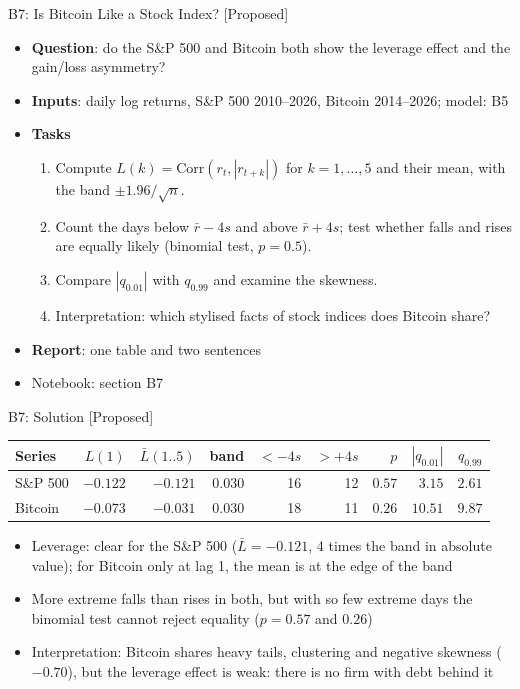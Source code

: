 \begin{frame}{B7: Is Bitcoin Like a Stock Index? [Proposed]}
\itemsize{\footnotesize}
\begin{itemize}
\item \textbf{Question}: do the S\&P 500 and Bitcoin both show the leverage effect and the gain/loss asymmetry?
\item \textbf{Inputs}: daily log returns, S\&P 500 2010--2026, Bitcoin 2014--2026; model: B5
\item \textbf{Tasks}
\begin{enumerate}
    \item Compute $L(k) = \text{Corr}(r_t, |r_{t+k}|)$ for $k = 1, \dots, 5$ and their mean, with the band $\pm 1.96/\sqrt n$.
    \item Count the days below $\bar r - 4s$ and above $\bar r + 4s$; test whether falls and rises are equally likely (binomial test, $p = 0.5$).
    \item Compare $|q_{0.01}|$ with $q_{0.99}$ and examine the skewness.
    \item Interpretation: which stylised facts of stock indices does Bitcoin share?
\end{enumerate}
\item \textbf{Report}: one table and two sentences
\item Notebook: section B7
\end{itemize}
\end{frame}

\ifsolutions
\begin{frame}{B7: Solution [Proposed]}
\itemsize{\footnotesize}
\begin{center}
\footnotesize
\begin{tabular}{lrrrrrrrr}
\toprule
Series & $L(1)$ & $\bar L(1..5)$ & band & $< -4s$ & $> +4s$ & $p$ & $|q_{0.01}|$ & $q_{0.99}$ \\
\midrule
S\&P 500 & $-0.122$ & $-0.121$ & $0.030$ & 16 & 12 & $0.57$ & $3.15$ & $2.61$ \\
Bitcoin & $-0.073$ & $-0.031$ & $0.030$ & 18 & 11 & $0.26$ & $10.51$ & $9.87$ \\
\bottomrule
\end{tabular}
\end{center}
\begin{itemize}
    \item Leverage: clear for the S\&P 500 ($\bar L = -0.121$, 4 times the band in absolute value); for Bitcoin only at lag 1, the mean is at the edge of the band
    \item More extreme falls than rises in both, but with so few extreme days the binomial test cannot reject equality ($p = 0.57$ and $0.26$)
    \item Interpretation: Bitcoin shares heavy tails, clustering and negative skewness ($-0.70$), but the leverage effect is weak: there is no firm with debt behind it
\end{itemize}
\end{frame}
\fi


